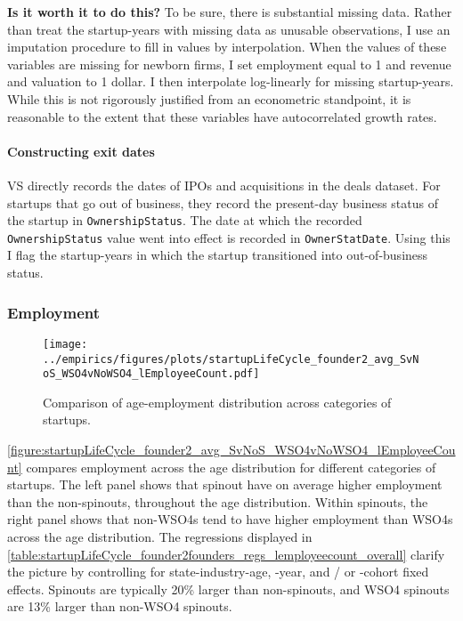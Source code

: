 \documentclass[12pt,english]{article}
\theoremstyle{remark}
\begin{document}
\textbf{Is it worth it to do this?} To be sure, there is substantial missing data. Rather than treat the startup-years with missing data as unusable observations, I use an imputation procedure to fill in values by interpolation. When the values of these variables are missing for newborn firms, I set employment equal to 1 and revenue and valuation to 1 dollar. I then interpolate log-linearly for missing startup-years. While this is not rigorously justified from an econometric standpoint, it is reasonable to the extent that these variables have autocorrelated growth rates. 

\paragraph{Constructing exit dates}

VS directly records the dates of IPOs and acquisitions in the deals dataset. For startups that go out of business, they record the present-day business status of the startup in \texttt{OwnershipStatus}. The date at which the recorded \texttt{OwnershipStatus} value went into effect is recorded in \texttt{OwnerStatDate}. Using this I flag the startup-years in which the startup transitioned into out-of-business status.


\subsubsection{Employment}

\begin{figure}[]
	\centering
	\texttt{[image: ../empirics/figures/plots/startupLifeCycle\_founder2\_avg\_SvNoS\_WSO4vNoWSO4\_lEmployeeCount.pdf]}
	\caption{Comparison of age-employment distribution across categories of startups.}
	\label{figure:startupLifeCycle_founder2_avg_SvNoS_WSO4vNoWSO4_lEmployeeCount}
\end{figure}

\autoref{figure:startupLifeCycle_founder2_avg_SvNoS_WSO4vNoWSO4_lEmployeeCount} compares employment across the age distribution for different categories of startups. The left panel shows that spinout have on average higher employment than the non-spinouts, throughout the age distribution. Within spinouts, the right panel shows that non-WSO4s tend to have higher employment than WSO4s across the age distribution. The regressions displayed in \autoref{table:startupLifeCycle_founder2founders_regs_lemployeecount_overall} clarify the picture by controlling for state-industry-age, -year, and / or -cohort fixed effects. Spinouts are typically 20\% larger than non-spinouts, and WSO4 spinouts are 13\% larger than non-WSO4 spinouts. 
\end{document}

